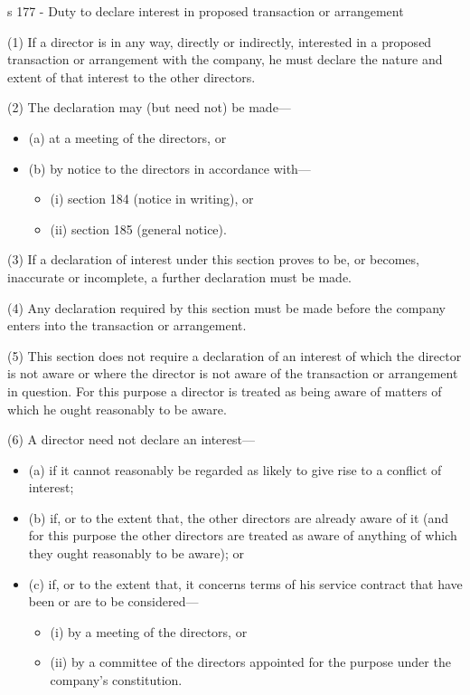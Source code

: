 \documentclass[
]{article}
\providecommand{\tightlist}{%
  \setlength{\itemsep}{0pt}\setlength{\parskip}{0pt}}
\newenvironment{env-136e818f-6bd8-45c9-b7d8-e6b8925f9e62}
{
    \savenotes\tcolorbox[blanker,breakable,left=5pt,borderline west={2pt}{-4pt}{green}]
}
{
    \endtcolorbox\spewnotes
}
\begin{document}
\begin{env-136e818f-6bd8-45c9-b7d8-e6b8925f9e62}

s 177 - Duty to declare interest in proposed transaction or arrangement

(1) If a director is in any way, directly or indirectly, interested in a
proposed transaction or arrangement with the company, he must declare
the nature and extent of that interest to the other directors.

(2) The declaration may (but need not) be made---

\begin{itemize}
\tightlist
\item
  (a) at a meeting of the directors, or
\item
  (b) by notice to the directors in accordance with---

  \begin{itemize}
  \tightlist
  \item
    (i) section 184 (notice in writing), or
  \item
    (ii) section 185 (general notice).
  \end{itemize}
\end{itemize}

(3) If a declaration of interest under this section proves to be, or
becomes, inaccurate or incomplete, a further declaration must be made.

(4) Any declaration required by this section must be made before the
company enters into the transaction or arrangement.

(5) This section does not require a declaration of an interest of which
the director is not aware or where the director is not aware of the
transaction or arrangement in question. For this purpose a director is
treated as being aware of matters of which he ought reasonably to be
aware.

(6) A director need not declare an interest---

\begin{itemize}
\tightlist
\item
  (a) if it cannot reasonably be regarded as likely to give rise to a
  conflict of interest;
\item
  (b) if, or to the extent that, the other directors are already aware
  of it (and for this purpose the other directors are treated as aware
  of anything of which they ought reasonably to be aware); or
\item
  (c) if, or to the extent that, it concerns terms of his service
  contract that have been or are to be considered---

  \begin{itemize}
  \tightlist
  \item
    (i) by a meeting of the directors, or
  \item
    (ii) by a committee of the directors appointed for the purpose under
    the company's constitution.
  \end{itemize}
\end{itemize}

\end{env-136e818f-6bd8-45c9-b7d8-e6b8925f9e62}
\end{document}
